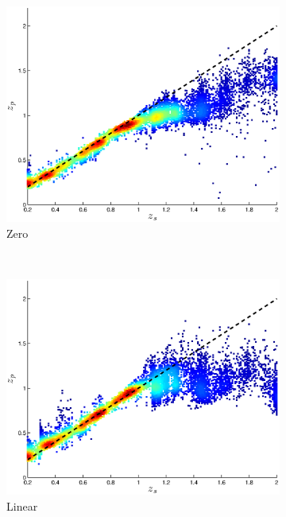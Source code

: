 \documentclass[useAMS,usenatbib,fleqn]{mn2e}
\begin{document}
\begin{figure}
       \begin{subfigure}[b]{0.3\textwidth}
                \includegraphics[width=\textwidth]{figures/22_0.eps}
                \caption{Zero}
        \end{subfigure}
        ~
        \begin{subfigure}[b]{0.3\textwidth}
                \includegraphics[width=\textwidth]{figures/22_L.eps}
                \caption{Linear}
        \end{subfigure}
        ~
        \begin{subfigure}[b]{0.3\textwidth}

\end{subfigure}
\end{figure}
\end{document}
